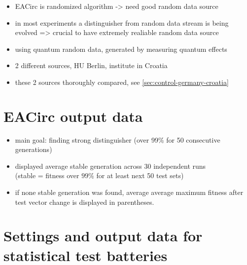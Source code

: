 \documentclass[12pt,oneside]{fithesis2}
\begin{document}
\begin{itemize}
\item EACirc is randomized algorithm -> need good random data source
\item in most experiments a distinguisher from random data stream is being evolved => crucial to have extremely realiable random data source
\item using quantum random data, generated by measuring quantum effects
\item 2 different sources, HU Berlin, institute in Croatia
\item these 2 sources thoroughly compared, see \autoref{sec:control-germany-croatia}
\end{itemize}

\section{EACirc output data}
\label{sec:settings-eacirc-output}

\begin{itemize}
\item main goal: finding strong distinguisher (over 99\% for 50 consecutive generations)
\item displayed average stable generation across 30 independent runs \\
(stable = fitness over $99\%$ for at least next 50 test sets)
\item if none stable generation was found, average average maximum fitness after test vector change is displayed in parentheses.
\end{itemize}

\section{Settings and output data for statistical test batteries}
\label{sec:settings-statistics}
\end{document}
